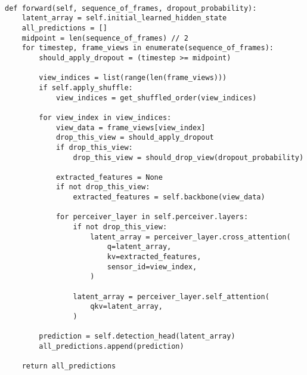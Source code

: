 \begin{verbatim}

def forward(self, sequence_of_frames, dropout_probability):
    latent_array = self.initial_learned_hidden_state
    all_predictions = []
    midpoint = len(sequence_of_frames) // 2
    for timestep, frame_views in enumerate(sequence_of_frames):
        should_apply_dropout = (timestep >= midpoint)

        view_indices = list(range(len(frame_views)))
        if self.apply_shuffle:
            view_indices = get_shuffled_order(view_indices)

        for view_index in view_indices:
            view_data = frame_views[view_index]
            drop_this_view = should_apply_dropout
            if drop_this_view:
                drop_this_view = should_drop_view(dropout_probability)

            extracted_features = None
            if not drop_this_view:
                extracted_features = self.backbone(view_data)

            for perceiver_layer in self.perceiver.layers:
                if not drop_this_view:
                    latent_array = perceiver_layer.cross_attention(
                        q=latent_array,
                        kv=extracted_features,
                        sensor_id=view_index,
                    )

                latent_array = perceiver_layer.self_attention(
                    qkv=latent_array,
                )

        prediction = self.detection_head(latent_array)
        all_predictions.append(prediction)

    return all_predictions

\end{verbatim}

